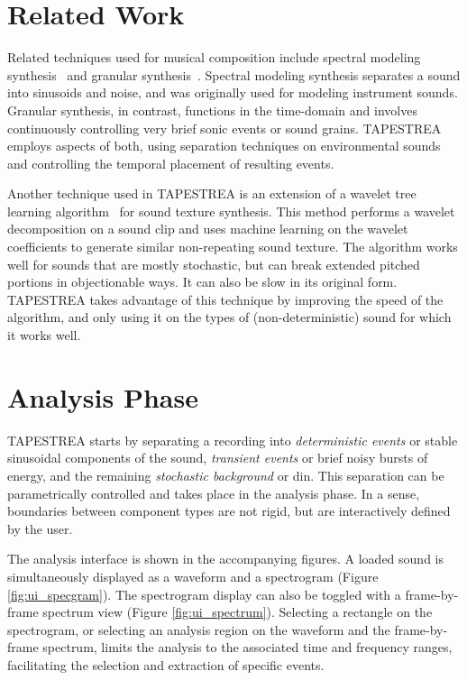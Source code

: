\documentclass[10pt,letterpaper]{article}
\begin{document}
\section{Related Work}

Related techniques used for musical composition include spectral modeling
synthesis~\cite{Serra89} and granular 
synthesis~\cite{Truax90,Roads02}. Spectral modeling synthesis 
separates a sound into sinusoids and
noise, and was originally used for modeling instrument sounds. Granular
synthesis, in contrast, functions in the time-domain and involves
continuously controlling very brief sonic events or sound grains. TAPESTREA
employs aspects of both, using separation techniques on environmental sounds
and controlling the temporal placement of resulting events.

Another technique used in TAPESTREA is an extension of a wavelet tree
learning algorithm~ for sound texture synthesis. This
method performs a wavelet decomposition on a sound clip and uses machine
learning on the wavelet coefficients to generate similar non-repeating sound
texture. The algorithm works well for sounds that are mostly stochastic, but
can break extended pitched portions in objectionable ways. It can also be 
slow in its original form. TAPESTREA takes advantage of this technique by 
improving the speed of the algorithm, and only using it on the types of 
(non-deterministic) sound for which it works well.

\section{Analysis Phase}

TAPESTREA starts by separating a recording into \textit{deterministic
events} or stable sinusoidal components of the
sound, \textit{transient events} or brief noisy bursts of energy, and the
remaining \textit{stochastic background} or din. This separation can
be parametrically controlled and takes place in the analysis
phase.  In a sense, boundaries between component types are not rigid,
but are interactively defined by the user.

The analysis interface is shown in the accompanying figures. A loaded
sound is simultaneously displayed as a waveform
and a spectrogram (Figure \ref{fig:ui_specgram}). The spectrogram
display can also be toggled with a frame-by-frame spectrum view (Figure
\ref{fig:ui_spectrum}). Selecting a rectangle on the spectrogram, or
selecting an analysis region on the waveform and the frame-by-frame
spectrum, limits the analysis to the associated time and frequency
ranges, facilitating the selection and extraction of specific events. 
\end{document}
